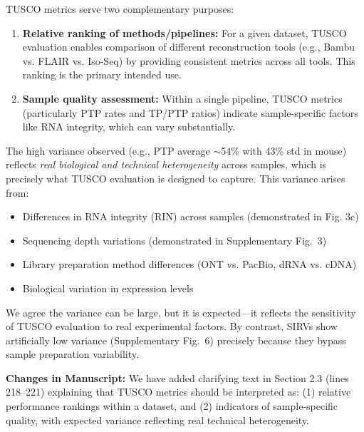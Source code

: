 \documentclass[11pt]{article}
\begin{document}
\begin{responseboxnew}
    TUSCO metrics serve two complementary
    purposes:

    \begin{enumerate}
      \item \textbf{Relative ranking of methods/pipelines:} For a given dataset,
        TUSCO evaluation enables comparison of different reconstruction tools (e.g., Bambu
        vs. FLAIR vs. Iso-Seq) by providing consistent metrics across all tools.
        This ranking is the primary intended use.

      \item \textbf{Sample quality assessment:} Within a single pipeline, TUSCO metrics
        (particularly PTP rates and TP/PTP ratios) indicate sample-specific factors
        like RNA integrity, which can vary substantially.
    \end{enumerate}

    \vspace{0.3cm}
    The high variance observed (e.g., PTP average
    $\sim$54\% with 43\% std in mouse) reflects \textit{real biological and
    technical heterogeneity} across samples, which is precisely what TUSCO evaluation is designed
    to capture. This variance arises from:

    \begin{itemize}
      \item Differences in RNA integrity (RIN) across samples (demonstrated in
        Fig. 3c)

      \item Sequencing depth variations (demonstrated in Supplementary Fig.~3)

      \item Library preparation method differences (ONT vs. PacBio, dRNA vs. cDNA)

      \item Biological variation in expression levels
    \end{itemize}

    We agree the variance can be large, but it is expected---it reflects the sensitivity of TUSCO evaluation
    to real experimental factors. By contrast, SIRVs show
    artificially low variance (Supplementary Fig.~6) precisely because they bypass sample preparation
    variability.

    \vspace{0.3cm}
    \textbf{Changes in Manuscript:} We have added clarifying text in Section 2.3 (lines 218--221)
    explaining that TUSCO metrics should be interpreted as: (1) relative performance
    rankings within a dataset, and (2) indicators of sample-specific quality, with
    expected variance reflecting real technical heterogeneity.
\end{responseboxnew}
\end{document}
